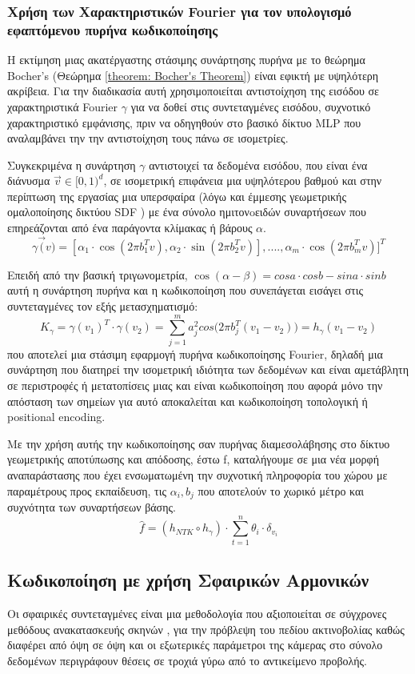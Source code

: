 \subsubsection{Χρήση των Χαρακτηριστικών Fourier για τον υπολογισμό εφαπτόμενου πυρήνα κωδικοποίησης}
\par
    Η εκτίμηση μιας ακατέργαστης στάσιμης συνάρτησης πυρήνα με το θεώρημα Bocher's (Θεώρημα \ref{theorem: Bocher's Theorem}) είναι εφικτή με υψηλότερη ακρίβεια.
    Για την διαδικασία αυτή χρησιμοποιείται αντιστοίχηση της εισόδου σε χαρακτηριστικά Fourier $\gamma$ για να δοθεί στις συντεταγμένες εισόδου, συχνοτικό χαρακτηριστικό εμφάνισης, πριν να οδηγηθούν στο βασικό δίκτυο MLP που αναλαμβάνει την την αντιστοίχηση τους πάνω σε ισομετρίες.
\par
    Συγκεκριμένα η συνάρτηση $\gamma$ αντιστοιχεί τα δεδομένα εισόδου, που είναι ένα διάνυσμα $\vec{v}\in[0,1)^d$, σε ισομετρική επιφάνεια μια υψηλότερου βαθμού και στην περίπτωση της εργασίας μια υπερσφαίρα (λόγω και έμμεσης γεωμετρικής ομαλοποίησης δικτύου SDF \cite{gropp2020implicit}) με ένα σύνολο ημιτονoειδών συναρτήσεων που επηρεάζονται από ένα παράγοντα κλίμακας ή βάρους $\alpha$.
        $$\gamma\vec(v) = [\alpha_1\cdot\cos(2 \pi b_1^{T}v), \alpha_2\cdot\sin(2\pi b_2^{T}v)],....,\alpha_m\cdot\cos(2\pi b_m^{T}v)]^{T} $$
\par 
    Επειδή από την βασική τριγωνομετρία, $\cos(\alpha - \beta) = cosa\cdot cosb - sina \cdot sinb$  αυτή  η συνάρτηση πυρήνα και η κωδικοποίηση που συνεπάγεται εισάγει στις συντεταγμένες τον εξής μετασχηματισμό:
    $$K_{\gamma} = \gamma(v_1)^{T}\cdot \gamma(v_2) = \sum_{j=1}^{m}{a^2_{j}cos(2\pi b_j^{T}(v_1 - v_2)}) = h_{\gamma}(v_1-v_2)$$
    που αποτελεί μια στάσιμη εφαρμογή πυρήνα κωδικοποίησης Fourier, δηλαδή μια συνάρτηση που διατηρεί την ισομετρική ιδιότητα των δεδομένων και είναι αμετάβλητη σε περιστροφές ή μετατοπίσεις μιας και είναι κωδικοποίηση που αφορά μόνο την απόσταση των σημείων για αυτό αποκαλείται και κωδικοποίηση τοπολογική ή positional encoding. 
\par
    Με την χρήση αυτής την κωδικοποίησης σαν πυρήνας διαμεσολάβησης  στο δίκτυο γεωμετρικής αποτύπωσης και απόδοσης, έστω f, καταλήγουμε σε μια νέα μορφή αναπαράστασης που έχει ενσωματωμένη την συχνοτική πληροφορία του χώρου με παραμέτρους προς εκπαίδευση, τις $\alpha_{i}, b_{j}$  που αποτελούν το χωρικό μέτρο και συχνότητα των συναρτήσεων βάσης.
    $$\hat{f} = ( h_{NTK} \circ h_{\gamma}) \cdot \sum_{t=1}^{n}\theta_{i} \cdot \delta_{v_i}$$ 

\subsection{Κωδικοποίηση με χρήση Σφαιρικών Αρμονικών \cite{nuajSphericalHarmonicsPortalWakapon}} 
\par
    Οι σφαιρικές συντεταγμένες είναι μια μεθοδολογία που αξιοποιείται σε σύγχρονες μεθόδους ανακατασκευής σκηνών \cite{yao2023geometryguided}, για την πρόβλεψη του πεδίου ακτινοβολίας καθώς διαφέρει από όψη σε όψη και οι εξωτερικές παράμετροι της κάμερας στο σύνολο δεδομένων περιγράφουν θέσεις σε τροχιά γύρω από το αντικείμενο προβολής.

